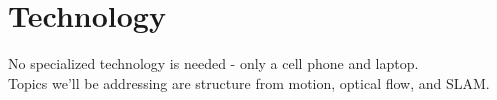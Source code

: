 \section{Technology}

No specialized technology is needed - only a cell phone and laptop. \\

Topics we'll be addressing are structure from motion, optical flow, and SLAM.
